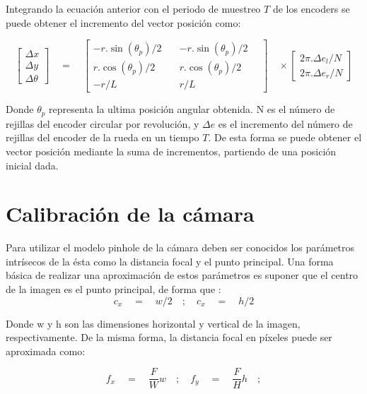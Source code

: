 Integrando la ecuación anterior con el periodo de muestreo $T$ de los encoders se puede obtener el incremento del vector posición como:

\begin{equation}
\label{eq:CineDirectoDelta}
\begin{bmatrix} \Delta x \\ \Delta y \\ \Delta \theta  \end{bmatrix}\quad =\quad \begin{bmatrix} -r.\sin { ({ \theta  }_{ p })/2\quad  }  & -r.\sin { ({ \theta  }_{ p })/2\quad  }  \\ r.\cos { ({ \theta  }_{ p })/2 }  & r.\cos { ({ \theta  }_{ p })/2 }  \\ -r/L & r/L \end{bmatrix}\quad \times \begin{bmatrix} { 2\pi .\Delta e }_{ l }/N \\ { 2\pi .\Delta e }_{ r }/N \end{bmatrix}
\end{equation}

Donde ${ \theta  }_{ p }$ representa la ultima posición angular obtenida. N es el número de rejillas del encoder circular por revolución, y $\Delta e$ es el incremento del número de rejillas del encoder de la rueda en un tiempo $T$. De esta forma se puede obtener el vector posición mediante la suma de incrementos, partiendo de una posición inicial dada.


\section{Calibración de la cámara}

Para utilizar el modelo pinhole de la cámara deben ser conocidos los parámetros intrísecos de la ésta como la distancia focal y el punto principal. Una forma básica de realizar una aproximación de estos parámetros es suponer que el centro de la imagen es el punto principal, de forma que :
\begin{equation}
{ c }_{ x }\quad =\quad w/2\quad ;\quad { c }_{ x }\quad =\quad h/2
\end{equation}

Donde w y h son las dimensiones horizontal y vertical de la imagen, respectivamente. De la misma forma, la distancia focal en píxeles puede ser aproximada como:

\begin{equation}
	{ f }_{ x }\quad =\quad \frac { F }{ W } w\quad ;\quad { f }_{ y }\quad =\quad \frac { F }{ H } h\quad ;
\end{equation}

